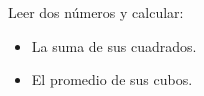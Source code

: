 Leer dos números y calcular:

\begin{itemize}
	\item La suma de sus cuadrados.
	\item El promedio de sus cubos.
\end{itemize}
